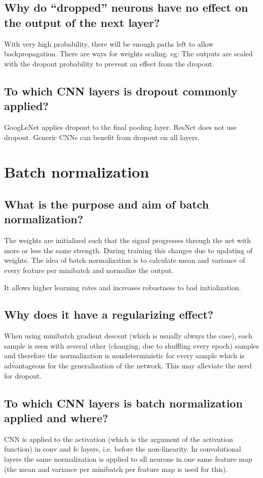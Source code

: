 \subsection{Why do ``dropped'' neurons have no effect on the output of the next layer?}
With very high probability, there will be enough paths left to allow backpropagation. There are ways for weights scaling. eg:
The outputs are scaled with the dropout probability to prevent an effect from the dropout.
\subsection{To which CNN layers is dropout commonly applied?}
GoogLeNet applies dropout to the final pooling layer. ResNet does not use dropout. Generic CNNs can benefit from dropout on all layers.
%
\section{Batch normalization}
\subsection{What is the purpose and aim of batch normalization?}
The weights are initialized such that the signal progresses through the net with more or less the same strength. During training this changes due to updating of weights. The idea of batch normalization is to calculate mean and variance of every feature per minibatch and normalize the output.

It allows higher learning rates and increases robustness to bad initialization.
\subsection{Why does it have a regularizing effect?}
When using minibatch gradient descent (which is usually always the case), each sample is seen with several other (changing, due to shuffling every epoch) samples and therefore the normalization is nondeterministic for every sample which is advantageous for the generalization of the network. This may alleviate the need for dropout.
\subsection{To which CNN layers is batch normalization applied and where?}
CNN is applied to the activation (which is the argument of the activation function) in conv and fc layers, i.e. before the non-linearity. In convolutional layers the same normalization is applied to all neurons in one same feature map (the mean and variance per minibatch per feature map is used for this).
%
